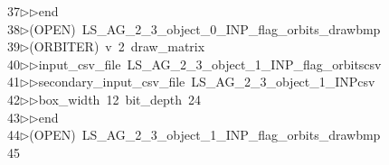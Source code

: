\begin{tabbing}
37\>$\triangleright$\>$\triangleright$\>end\\[0pt]
38\>$\triangleright$\>(OPEN)\ LS\_AG\_2\_3\_object\_0\_INP\_flag\_orbits\_drawbmp\\[0pt]
39\>$\triangleright$\>(ORBITER)\ v\ 2\ draw\_matrix\ \\[0pt]
40\>$\triangleright$\>$\triangleright$\>input\_csv\_file\ LS\_AG\_2\_3\_object\_1\_INP\_flag\_orbitscsv\ \\[0pt]
41\>$\triangleright$\>$\triangleright$\>secondary\_input\_csv\_file\ LS\_AG\_2\_3\_object\_1\_INPcsv\ \\[0pt]
42\>$\triangleright$\>$\triangleright$\>box\_width\ 12\ bit\_depth\ 24\ \\[0pt]
43\>$\triangleright$\>$\triangleright$\>end\\[0pt]
44\>$\triangleright$\>(OPEN)\ LS\_AG\_2\_3\_object\_1\_INP\_flag\_orbits\_drawbmp\\[0pt]
45\>\end{tabbing}
